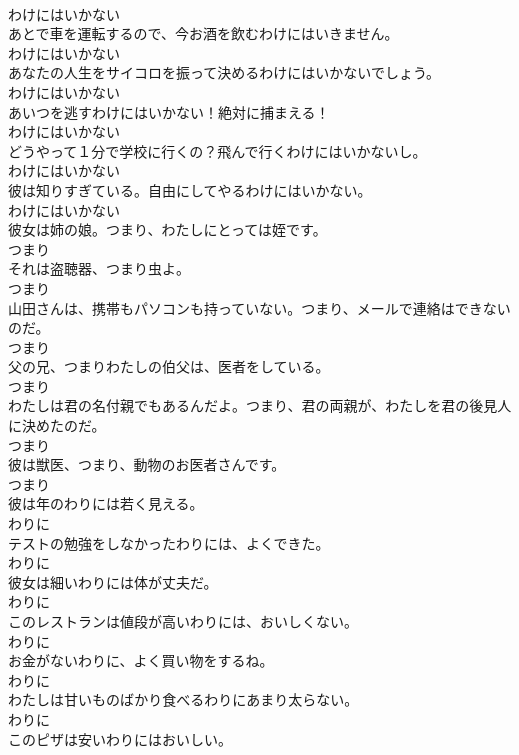 \documentclass[8pt]{extreport}
\begin{document}
\begin{CJK}{UTF8}{min}
\\	わけにはいかない
\\	あとで車を運転するので、今お酒を飲むわけにはいきません。	
\\	わけにはいかない
\\	あなたの人生をサイコロを振って決めるわけにはいかないでしょう。	
\\	わけにはいかない
\\	あいつを逃すわけにはいかない！絶対に捕まえる！	
\\	わけにはいかない
\\	どうやって１分で学校に行くの？飛んで行くわけにはいかないし。	
\\	わけにはいかない
\\	彼は知りすぎている。自由にしてやるわけにはいかない。	
\\	わけにはいかない
\\	彼女は姉の娘。つまり、わたしにとっては姪です。	
\\	つまり
\\	それは盗聴器、つまり虫よ。	
\\	つまり
\\	山田さんは、携帯もパソコンも持っていない。つまり、メールで連絡はできないのだ。	
\\	つまり
\\	父の兄、つまりわたしの伯父は、医者をしている。	
\\	つまり
\\	わたしは君の名付親でもあるんだよ。つまり、君の両親が、わたしを君の後見人に決めたのだ。	
\\	つまり
\\	彼は獣医、つまり、動物のお医者さんです。	
\\	つまり
\\	彼は年のわりには若く見える。	
\\	わりに
\\	テストの勉強をしなかったわりには、よくできた。	
\\	わりに
\\	彼女は細いわりには体が丈夫だ。	
\\	わりに
\\	このレストランは値段が高いわりには、おいしくない。	
\\	わりに
\\	お金がないわりに、よく買い物をするね。	
\\	わりに
\\	わたしは甘いものばかり食べるわりにあまり太らない。	
\\	わりに
\\	このピザは安いわりにはおいしい。	

\end{CJK}
\end{document}
